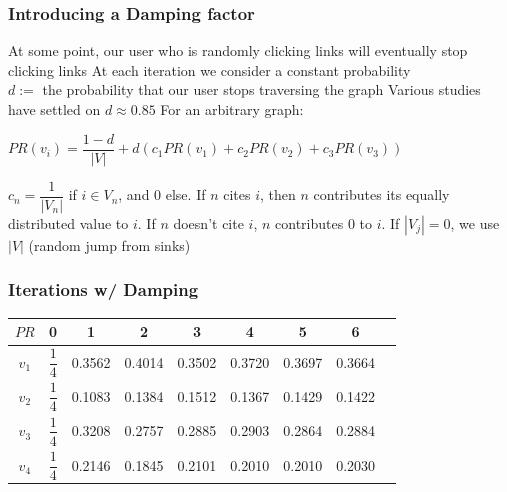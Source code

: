 \documentclass{beamer}
\begin{document}
\begin{frame}[t]
\frametitle{Introducing a Damping factor}
\begin{outline}
    \1 At some point, our user who is randomly clicking links will eventually stop clicking links
    \1 At each iteration we consider a constant probability\\ $d :=$ the probability that our user stops traversing the graph
        \2 Various studies have settled on $d\approx 0.85$
    \1 For an arbitrary graph:
\end{outline}
\begin{mdframed}[backgroundcolor=blue!20]
    \begin{math}
        PR(v_i) = \dfrac{1-d}{|V|} + d(c_1PR(v_1) + c_2PR(v_2) + c_3PR(v_3))
    \end{math}
\end{mdframed}
\begin{outline}
    \1 $c_n = \dfrac{1}{|V_n|}$ if $i \in V_n$, and 0 else. 
        \2 If $n$ cites $i$, then $n$ contributes its equally distributed value to $i$. If $n$ doesn't cite $i$, $n$ contributes 0 to $i$.
    \1 If $|V_j| = 0$, we use $|V|$ (random jump from sinks)
\end{outline}
\end{frame}

\begin{frame}
\frametitle{Iterations w/ Damping}
\bgroup
\def\arraystretch{2.5}
\begin{tabular}{|c|c|c|c|c|c|c|c|c|}
    \hline
    $PR$ & 0 & 1 & 2 & 3 & 4 & 5 & 6 \\%
    \hline
    $v_1$ & $\dfrac{1}{4}$ & 0.3562 & 0.4014 & 0.3502 & 0.3720 & 0.3697 & 0.3664\\%
    $v_2$ & $\dfrac{1}{4}$ & 0.1083 & 0.1384 & 0.1512 & 0.1367 & 0.1429 & 0.1422\\%
    $v_3$ & $\dfrac{1}{4}$ & 0.3208 & 0.2757 & 0.2885 & 0.2903 & 0.2864 & 0.2884\\%
    $v_4$ & $\dfrac{1}{4}$ & 0.2146 & 0.1845 & 0.2101 & 0.2010 & 0.2010 & 0.2030\\%
    \hline
\end{tabular}
\egroup
\end{frame}

\end{document}
